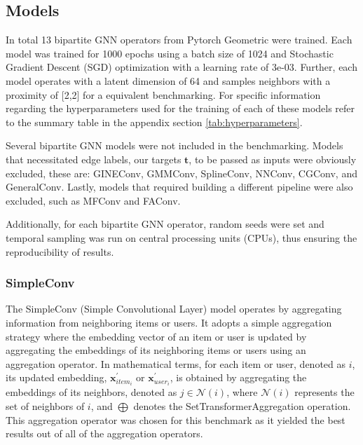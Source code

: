 \documentclass{scrartcl}
\begin{document}
\subsection{Models}

\quad In total 13 bipartite GNN operators from Pytorch Geometric were trained. Each model was trained for 1000 epochs using a batch size of 1024 and Stochastic Gradient Descent (SGD) optimization with a learning rate of 3e-03. Further, each model operates with a latent dimension of 64 and samples neighbors with a proximity of [2,2] for a equivalent benchmarking. For specific information regarding the hyperparameters used for the training of each of these models refer to the summary table in the appendix section \ref{tab:hyperparameters}.

Several bipartite GNN models were not included in the benchmarking. Models that necessitated edge labels, our targets $\mathbf{t}$, to be passed as inputs were obviously excluded, these are: GINEConv\cite{gineconv}, GMMConv\cite{gmmconv}, SplineConv\cite{splineconv}, NNConv\cite{nnconv}, CGConv\cite{cgconv}, and GeneralConv\cite{generalconv}. Lastly, models that required building a different pipeline were also excluded, such as MFConv\cite{mfconv} and FAConv\cite{faconv}.

Additionally, for each bipartite GNN operator, random seeds were set and temporal sampling was run on central processing units (CPUs), thus ensuring the reproducibility of results.


\subsubsection{SimpleConv}

\quad The SimpleConv (Simple Convolutional Layer) model operates by aggregating information from neighboring items or users. It adopts a simple aggregation strategy where the embedding vector of an item or user is updated by aggregating the embeddings of its neighboring items or users using an aggregation operator. In mathematical terms, for each item or user, denoted as $i$, its updated embedding, $\mathbf{x}^{\prime}_{item_i}$ or $\mathbf{x}^{\prime}_{user_i}$, is obtained by aggregating the embeddings of its neighbors, denoted as $j \in \mathcal{N}(i)$, where $\mathcal{N}(i)$ represents the set of neighbors of $i$, and $\bigoplus$ denotes the SetTransformerAggregation\cite{simpleconv} operation. This aggregation operator was chosen for this benchmark as it yielded the best results out of all of the aggregation operators. \\ 
\end{document}
